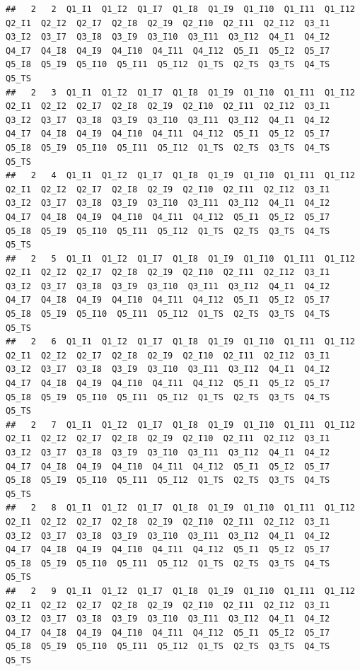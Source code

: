 \documentclass[
]{book}
\begin{document}
\begin{verbatim}
##   2   2  Q1_I1  Q1_I2  Q1_I7  Q1_I8  Q1_I9  Q1_I10  Q1_I11  Q1_I12  Q2_I1  Q2_I2  Q2_I7  Q2_I8  Q2_I9  Q2_I10  Q2_I11  Q2_I12  Q3_I1  Q3_I2  Q3_I7  Q3_I8  Q3_I9  Q3_I10  Q3_I11  Q3_I12  Q4_I1  Q4_I2  Q4_I7  Q4_I8  Q4_I9  Q4_I10  Q4_I11  Q4_I12  Q5_I1  Q5_I2  Q5_I7  Q5_I8  Q5_I9  Q5_I10  Q5_I11  Q5_I12  Q1_TS  Q2_TS  Q3_TS  Q4_TS  Q5_TS
##   2   3  Q1_I1  Q1_I2  Q1_I7  Q1_I8  Q1_I9  Q1_I10  Q1_I11  Q1_I12  Q2_I1  Q2_I2  Q2_I7  Q2_I8  Q2_I9  Q2_I10  Q2_I11  Q2_I12  Q3_I1  Q3_I2  Q3_I7  Q3_I8  Q3_I9  Q3_I10  Q3_I11  Q3_I12  Q4_I1  Q4_I2  Q4_I7  Q4_I8  Q4_I9  Q4_I10  Q4_I11  Q4_I12  Q5_I1  Q5_I2  Q5_I7  Q5_I8  Q5_I9  Q5_I10  Q5_I11  Q5_I12  Q1_TS  Q2_TS  Q3_TS  Q4_TS  Q5_TS
##   2   4  Q1_I1  Q1_I2  Q1_I7  Q1_I8  Q1_I9  Q1_I10  Q1_I11  Q1_I12  Q2_I1  Q2_I2  Q2_I7  Q2_I8  Q2_I9  Q2_I10  Q2_I11  Q2_I12  Q3_I1  Q3_I2  Q3_I7  Q3_I8  Q3_I9  Q3_I10  Q3_I11  Q3_I12  Q4_I1  Q4_I2  Q4_I7  Q4_I8  Q4_I9  Q4_I10  Q4_I11  Q4_I12  Q5_I1  Q5_I2  Q5_I7  Q5_I8  Q5_I9  Q5_I10  Q5_I11  Q5_I12  Q1_TS  Q2_TS  Q3_TS  Q4_TS  Q5_TS
##   2   5  Q1_I1  Q1_I2  Q1_I7  Q1_I8  Q1_I9  Q1_I10  Q1_I11  Q1_I12  Q2_I1  Q2_I2  Q2_I7  Q2_I8  Q2_I9  Q2_I10  Q2_I11  Q2_I12  Q3_I1  Q3_I2  Q3_I7  Q3_I8  Q3_I9  Q3_I10  Q3_I11  Q3_I12  Q4_I1  Q4_I2  Q4_I7  Q4_I8  Q4_I9  Q4_I10  Q4_I11  Q4_I12  Q5_I1  Q5_I2  Q5_I7  Q5_I8  Q5_I9  Q5_I10  Q5_I11  Q5_I12  Q1_TS  Q2_TS  Q3_TS  Q4_TS  Q5_TS
##   2   6  Q1_I1  Q1_I2  Q1_I7  Q1_I8  Q1_I9  Q1_I10  Q1_I11  Q1_I12  Q2_I1  Q2_I2  Q2_I7  Q2_I8  Q2_I9  Q2_I10  Q2_I11  Q2_I12  Q3_I1  Q3_I2  Q3_I7  Q3_I8  Q3_I9  Q3_I10  Q3_I11  Q3_I12  Q4_I1  Q4_I2  Q4_I7  Q4_I8  Q4_I9  Q4_I10  Q4_I11  Q4_I12  Q5_I1  Q5_I2  Q5_I7  Q5_I8  Q5_I9  Q5_I10  Q5_I11  Q5_I12  Q1_TS  Q2_TS  Q3_TS  Q4_TS  Q5_TS
##   2   7  Q1_I1  Q1_I2  Q1_I7  Q1_I8  Q1_I9  Q1_I10  Q1_I11  Q1_I12  Q2_I1  Q2_I2  Q2_I7  Q2_I8  Q2_I9  Q2_I10  Q2_I11  Q2_I12  Q3_I1  Q3_I2  Q3_I7  Q3_I8  Q3_I9  Q3_I10  Q3_I11  Q3_I12  Q4_I1  Q4_I2  Q4_I7  Q4_I8  Q4_I9  Q4_I10  Q4_I11  Q4_I12  Q5_I1  Q5_I2  Q5_I7  Q5_I8  Q5_I9  Q5_I10  Q5_I11  Q5_I12  Q1_TS  Q2_TS  Q3_TS  Q4_TS  Q5_TS
##   2   8  Q1_I1  Q1_I2  Q1_I7  Q1_I8  Q1_I9  Q1_I10  Q1_I11  Q1_I12  Q2_I1  Q2_I2  Q2_I7  Q2_I8  Q2_I9  Q2_I10  Q2_I11  Q2_I12  Q3_I1  Q3_I2  Q3_I7  Q3_I8  Q3_I9  Q3_I10  Q3_I11  Q3_I12  Q4_I1  Q4_I2  Q4_I7  Q4_I8  Q4_I9  Q4_I10  Q4_I11  Q4_I12  Q5_I1  Q5_I2  Q5_I7  Q5_I8  Q5_I9  Q5_I10  Q5_I11  Q5_I12  Q1_TS  Q2_TS  Q3_TS  Q4_TS  Q5_TS
##   2   9  Q1_I1  Q1_I2  Q1_I7  Q1_I8  Q1_I9  Q1_I10  Q1_I11  Q1_I12  Q2_I1  Q2_I2  Q2_I7  Q2_I8  Q2_I9  Q2_I10  Q2_I11  Q2_I12  Q3_I1  Q3_I2  Q3_I7  Q3_I8  Q3_I9  Q3_I10  Q3_I11  Q3_I12  Q4_I1  Q4_I2  Q4_I7  Q4_I8  Q4_I9  Q4_I10  Q4_I11  Q4_I12  Q5_I1  Q5_I2  Q5_I7  Q5_I8  Q5_I9  Q5_I10  Q5_I11  Q5_I12  Q1_TS  Q2_TS  Q3_TS  Q4_TS  Q5_TS

\end{verbatim}
\end{document}
